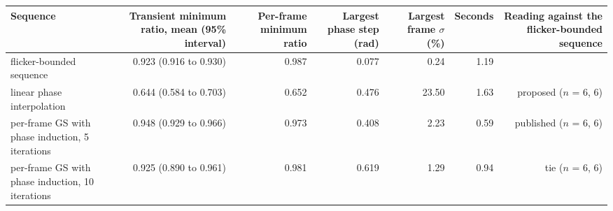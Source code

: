 \begin{tabular}{@{}l r r r r r r@{}}
\toprule
Sequence & Transient minimum ratio, mean (95\% interval) & Per-frame minimum ratio & Largest phase step (rad) & Largest frame $\sigma$ (\%) & Seconds & Reading against the flicker-bounded sequence \\
\midrule
flicker-bounded sequence & 0.923 (0.916 to 0.930) & 0.987 & 0.077 & 0.24 & 1.19 &  \\
linear phase interpolation & 0.644 (0.584 to 0.703) & 0.652 & 0.476 & 23.50 & 1.63 & proposed ($n$ = 6, 6) \\
per-frame GS with phase induction, 5 iterations & 0.948 (0.929 to 0.966) & 0.973 & 0.408 & 2.23 & 0.59 & published ($n$ = 6, 6) \\
per-frame GS with phase induction, 10 iterations & 0.925 (0.890 to 0.961) & 0.981 & 0.619 & 1.29 & 0.94 & tie ($n$ = 6, 6) \\
\bottomrule
\end{tabular}
